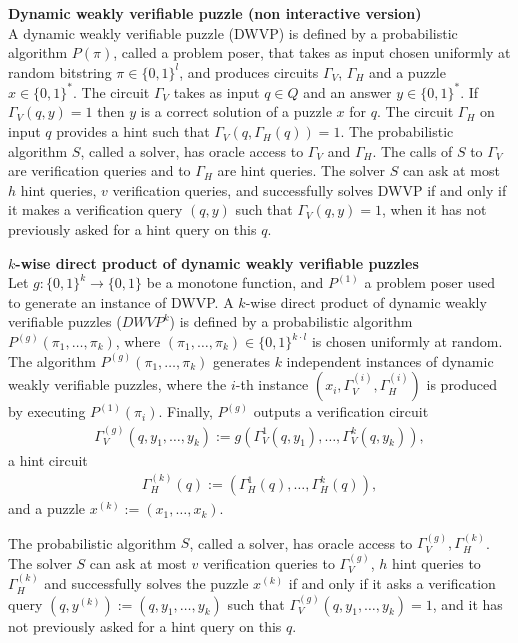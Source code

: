 \begin{definition} {\textbf{Dynamic weakly verifiable puzzle (non interactive version)}}\\
  A dynamic weakly verifiable puzzle (DWVP) is defined by a probabilistic algorithm $P(\pi)$,
  called a problem poser, that takes as input chosen uniformly at random bitstring $\pi \in \{0,1\}^l$,
  and produces circuits $\Gamma_{V}$, $\Gamma_{H}$ and a puzzle $x \in \{0,1\}^{*}$.
  The circuit $\Gamma_{V}$ takes as input $q \in Q$ and an answer $y \in \{0,1\}^*$.
  If $\Gamma_V(q,y) = 1$ then $y$ is a correct solution of a puzzle $x$ for $q$.
  The circuit $\Gamma_H$ on input $q$ provides a hint such that $\Gamma_V(q,\Gamma_H(q)) = 1$.
  The probabilistic algorithm $S$, called a solver, has oracle access to $\Gamma_V$ and $\Gamma_H$.
  The calls of $S$ to $\Gamma_V$ are verification queries and to $\Gamma_H$ are hint queries.
  The solver $S$ can ask at most $h$ hint queries, $v$ verification queries, and successfully solves DWVP if and only if
  it makes a verification query $(q,y)$ such that $\Gamma_V(q,y) = 1$, when it has not previously asked for a hint query on this $q$.
\end{definition}
%
%
\begin{definition}{\textbf{$k$-wise direct product of dynamic weakly verifiable puzzles}}\\
Let $g: \{0,1\}^{k} \rightarrow \{0,1\}$ be a monotone function, and $P^{(1)}$ a problem poser used to generate an instance of DWVP.
A $k$-wise direct product of dynamic weakly verifiable puzzles ($DWVP^k$) is defined by a probabilistic algorithm $P^{(g)}\left(\pi_1, \dots, \pi_k \right)$,
where $(\pi_1, \dots, \pi_k) \in \{0,1\}^{k \cdot l}$ is chosen uniformly at random.
The algorithm $P^{(g)}\left(\pi_1, \dots, \pi_k \right)$ generates $k$ independent instances of dynamic weakly verifiable puzzles,
where the $i$-th instance $(x_i, \Gamma_V^{(i)}, \Gamma_H^{(i)} )$ is produced by executing $P^{(1)}(\pi_i)$.
Finally, $P^{(g)}$ outputs a verification circuit
\begin{align*}
  \Gamma_V^{(g)} (q, y_1, \dots, y_k) := g(\Gamma_V^{1}(q, y_1), \dots, \Gamma_V^{k}(q, y_k)),
\end{align*}
a hint circuit
\begin{align*}
  \Gamma_H^{(k)} (q) := (\Gamma_H^{1}(q), \dots, \Gamma_H^{k}(q)),
\end{align*}
and a puzzle $x^{(k)} := (x_1, \dots, x_k)$.

The probabilistic algorithm $S$, called a solver, has oracle access to $\Gamma_V^{(g)}, \Gamma_H^{(k)}$.
The solver $S$ can ask at most $v$ verification queries to $\Gamma_V^{(g)}$, $h$ hint queries to $\Gamma_H^{(k)}$ and successfully solves the puzzle $x^{(k)}$
if and only if it asks a verification query $(q, y^{(k)}) := (q, y_1, \dots, y_k)$ such that $\Gamma_V^{(g)}(q, y_1, \dots, y_k) = 1$, and it has not previously asked for a hint query on this $q$.
\end{definition}
